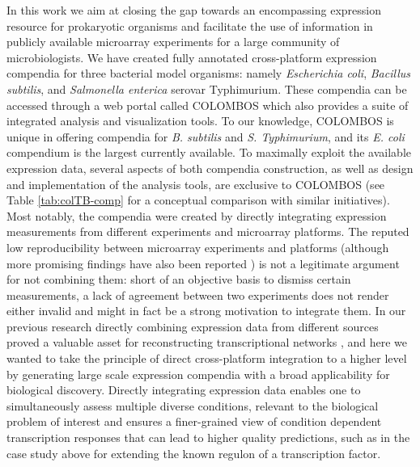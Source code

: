 In this work we aim at closing the gap towards an encompassing expression  resource for prokaryotic organisms and facilitate the use of information in  publicly available microarray experiments for a large community of  microbiologists. We have created fully annotated cross-platform expression  compendia for three bacterial model organisms: namely {\it Escherichia coli},  {\it Bacillus subtilis}, and {\it Salmonella enterica} serovar Typhimurium.  These compendia can be accessed through a web portal called COLOMBOS which also  provides a suite of integrated analysis and visualization tools. To our  knowledge, COLOMBOS is unique in offering compendia for {\it B. subtilis} and  {\it S. Typhimurium}, and its {\it E. coli} compendium is the largest currently  available. To maximally exploit the available expression data, several aspects  of both compendia construction, as well as design and implementation of the  analysis tools, are exclusive to COLOMBOS (see Table \ref{tab:colTB-comp} for a  conceptual comparison with similar initiatives). Most notably, the compendia  were created by directly integrating expression measurements from different  experiments and microarray platforms. The reputed low reproducibility between  microarray experiments and platforms \cite{Bammler2005, Tan2003} (although more  promising findings have also been reported \cite{Shi2006, Kuo2006, Shi2005}) is  not a legitimate argument for not combining them: short of an objective basis  to dismiss certain measurements, a lack of agreement between two experiments  does not render either invalid and might in fact be a strong motivation to  integrate them. In our previous research directly combining expression data  from different sources proved a valuable asset for reconstructing  transcriptional networks \cite{Lemmens2009, Fadda2009, Zarrineh2011}, and here  we wanted to take the principle of direct cross-platform integration to a  higher level by generating large scale expression compendia with a broad  applicability for biological discovery. Directly integrating expression data  enables one to simultaneously assess multiple diverse conditions, relevant to  the biological problem of interest and ensures a finer-grained view of  condition dependent transcription responses that can lead to higher quality  predictions, such as in the case study above for extending the known regulon of  a transcription factor.

